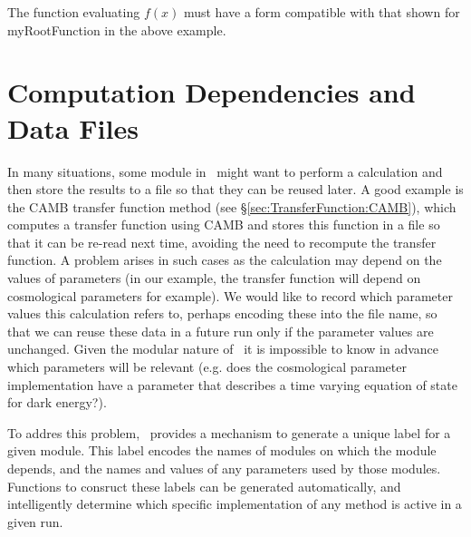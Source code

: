 The function evaluating $f(x)$ must have a form compatible with that shown for {\normalfont \ttfamily myRootFunction} in the above example.

\section{Computation Dependencies and Data Files}

In many situations, some module in \glc\ might want to perform a calculation and then store the results to a file so that they can be reused later. A good example is the {\normalfont \ttfamily CAMB} transfer function method (see \S\ref{sec:TransferFunction:CAMB}), which computes a transfer function using {\normalfont \scshape CAMB} and stores this function in a file so that it can be re-read next time, avoiding the need to recompute the transfer function. A problem arises in such cases as the calculation may depend on the values of parameters (in our example, the transfer function will depend on cosmological parameters for example). We would like to record which parameter values this calculation refers to, perhaps encoding these into the file name, so that we can reuse these data in a future run only if the parameter values are unchanged. Given the modular nature of \glc\ it is impossible to know in advance which parameters will be relevant (e.g. does the cosmological parameter implementation have a parameter that describes a time varying equation of state for dark energy?). 

To addres this problem, \glc\ provides a mechanism to generate a unique label for a given module. This label encodes the names of modules on which the module depends, and the names and values of any parameters used by those modules. Functions to consruct these labels can be generated automatically, and intelligently determine which specific implementation of any method is active in a given run.

